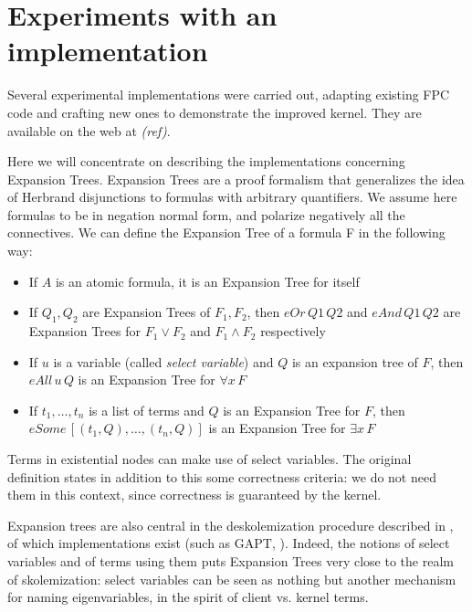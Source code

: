 \documentclass[a4paper,USenglish]{lipics-v2018}
\begin{document}
{\section{Experiments with an implementation}
\label{sec:implementation}
Several experimental implementations were carried out, adapting
existing FPC code and crafting new ones to demonstrate the improved
kernel. They are available on the web at \emph{(ref)}.

Here we will concentrate on describing the implementations concerning
Expansion Trees. Expansion Trees \cite{miller87sl} are a proof
formalism that generalizes the idea of Herbrand disjunctions to
formulas with arbitrary quantifiers.
%
We assume here formulas to be in negation normal form, and polarize
negatively all the connectives. We can define the Expansion Tree of a
formula F in the following way:

\begin{definition} \mbox{}
  \begin{itemize}
  \item If $A$ is an atomic formula, it is an Expansion Tree for
itself
  \item If $Q_1, Q_2$ are Expansion Trees of $F_1,F_2$, then $eOr\,
Q1\, Q2$ and $eAnd\, Q1\, Q2$ are Expansion Trees for $F_1 \lor F_2$
and $F_1 \land F_2$ respectively
  \item If $u$ is a variable (called \emph{select variable}) and $Q$
is an expansion tree of $F$, then $eAll \, u \, Q$ is an Expansion
Tree for $\forall x \, F$
  \item If $t_1,\dots,t_n$ is a list of terms and $Q$ is an Expansion
Tree for $F$, then $eSome \, [(t_1,Q),\dots,(t_n,Q)]$ is an Expansion
Tree for $\exists x \, F$
  \end{itemize}
\end{definition}

Terms in existential nodes can make use of select variables. The
original definition states in addition to this some correctness
criteria: we do not need them in this context, since correctness is
guaranteed by the kernel.

Expansion trees are also central in the deskolemization procedure
described in \cite{baaz12jsl}, of which implementations exist (such as
GAPT, \cite{ebner16ijcar}).
%
Indeed, the notions of select variables and of terms using them puts
Expansion Trees very close to the realm of skolemization: select
variables can be seen as nothing but another mechanism for naming
eigenvariables, in the spirit of client vs. kernel terms.

}
\end{document}
